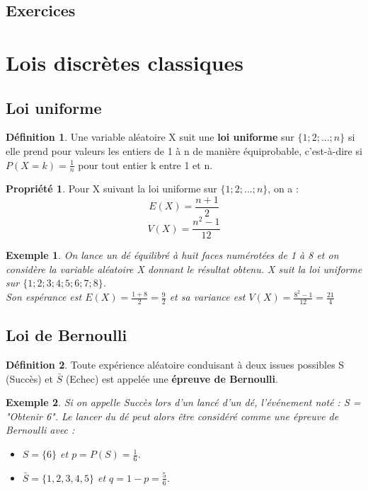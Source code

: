 \documentclass[a4paper,12pt,final]{article}
\newtheorem{Ex}{Exemple}[section]
\theoremstyle{theorem}
\theoremstyle{definition}
\newtheorem{Propriete}{Propriété}[section]
\theoremstyle{definition}
\theoremstyle{definition}
\newtheorem{Def}{Définition}[section]
\begin{document}
	\subsection{Exercices}
	
\section{Lois discrètes classiques}
	\subsection{Loi uniforme}
	
	\begin{Def}
		Une variable aléatoire X suit une \textbf{loi uniforme} sur $\{1;2;...;n\}$ si elle prend pour valeurs les entiers de 1 à n de manière équiprobable, c'est-à-dire si $P(X = k) = \frac{1}{n}$ pour tout entier k entre 1 et n.
	\end{Def}

	\begin{Propriete}
		Pour X suivant la loi uniforme sur $\{1;2;...;n\}$, on a : 
		\[E(X) = \frac{n+1}{2}\]
		\[V(X) = \frac{n^{2} - 1}{12}\]
	\end{Propriete}

	\begin{Ex}
		On lance un dé équilibré à huit faces numérotées de 1 à 8 et on considère la variable aléatoire X donnant le résultat obtenu. X suit la loi uniforme sur $\{1;2;3;4;5;6;7;8\}$. \\
		Son espérance est $E(X) = \frac{1+8}{2}= \frac{9}{2}$ et sa variance est $V(X) = \frac{8^{2} - 1}{12} = \frac{21}{4}$
	\end{Ex}

	\subsection{Loi de Bernoulli}
	
	\begin{Def}
		Toute expérience aléatoire conduisant à deux issues possibles S (Succès) et $\bar{S}$ (Echec) est appelée une \textbf{épreuve de Bernoulli}.
	\end{Def}
	\begin{Ex}
		Si on appelle Succès lors d'un lancé d'un dé, l'événement noté : S = "Obtenir 6". Le lancer du dé peut alors être considéré comme une épreuve de Bernoulli avec :\begin{itemize}
			\item $ S = \{6\}$ et $p = P(S) = \frac{1}{6}$.
			\item $\bar{S} = \{1,2,3,4,5\}$ et $q = 1-p = \frac{5}{6}$.
		\end{itemize}
	\end{Ex}
\end{document}

